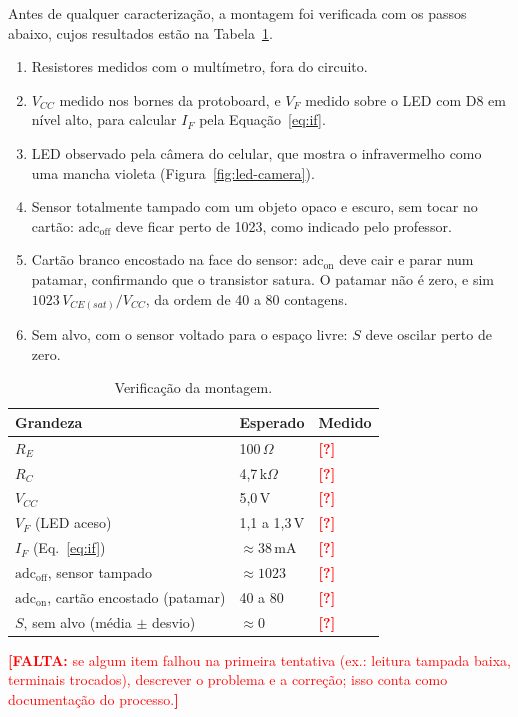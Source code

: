 \documentclass[11pt,a4paper]{article}
\newcommand{\pendente}[1]{\textcolor{red}{\textbf{[FALTA:} #1\textbf{]}}}
\newcommand{\pnd}{\textcolor{red}{\textbf{[?]}}}
\begin{document}
Antes de qualquer caracterização, a montagem foi verificada com os passos abaixo, cujos resultados estão na Tabela~\ref{tab:verificacao}.
\begin{enumerate}[nosep]
  \item Resistores medidos com o multímetro, fora do circuito.
  \item $V_{CC}$ medido nos bornes da protoboard, e $V_F$ medido sobre o LED com D8 em nível alto, para calcular $I_F$ pela Equação~\eqref{eq:if}.
  \item LED observado pela câmera do celular, que mostra o infravermelho como uma mancha violeta (Figura~\ref{fig:led-camera}).
  \item Sensor totalmente tampado com um objeto opaco e escuro, sem tocar no cartão: $\text{adc}_\text{off}$ deve ficar perto de 1023, como indicado pelo professor.
  \item Cartão branco encostado na face do sensor: $\text{adc}_\text{on}$ deve cair e parar num patamar, confirmando que o transistor satura. O patamar não é zero, e sim $1023\, V_{CE(sat)}/V_{CC}$, da ordem de 40 a 80 contagens.
  \item Sem alvo, com o sensor voltado para o espaço livre: $S$ deve oscilar perto de zero.
\end{enumerate}

\begin{table}[H]
\centering
\caption{Verificação da montagem.}
\label{tab:verificacao}
\begin{tabular}{lll}
\toprule
Grandeza & Esperado & Medido \\
\midrule
$R_E$ & 100\,$\Omega$ & \pnd \\
$R_C$ & 4,7\,k$\Omega$ & \pnd \\
$V_{CC}$ & 5,0\,V & \pnd \\
$V_F$ (LED aceso) & 1,1 a 1,3\,V & \pnd \\
$I_F$ (Eq.~\ref{eq:if}) & $\approx 38$\,mA & \pnd \\
$\text{adc}_\text{off}$, sensor tampado & $\approx 1023$ & \pnd \\
$\text{adc}_\text{on}$, cartão encostado (patamar) & 40 a 80 & \pnd \\
$S$, sem alvo (média $\pm$ desvio) & $\approx 0$ & \pnd \\
\bottomrule
\end{tabular}
\end{table}

\pendente{se algum item falhou na primeira tentativa (ex.: leitura tampada baixa, terminais trocados), descrever o problema e a correção; isso conta como documentação do processo.}
\end{document}
